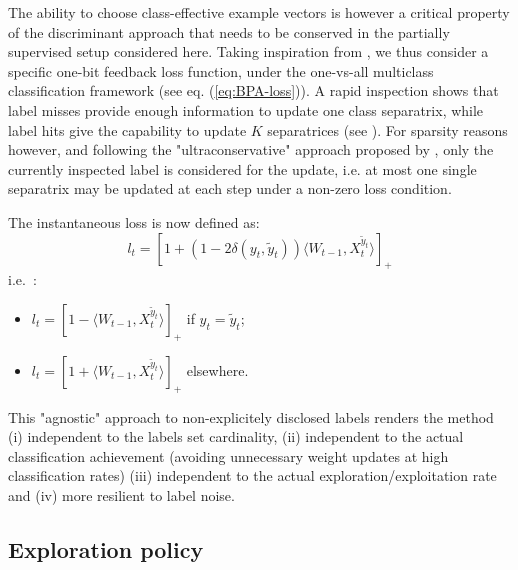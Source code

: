 \documentclass[preprint,12pt,authoryear]{elsarticle}
\begin{document}
The ability to choose class-effective example vectors is however  a critical property of the discriminant approach that needs to be conserved in the partially supervised setup considered here. 
Taking inspiration from \cite{crammer2006online}, we thus consider a specific one-bit feedback loss function, under the one-vs-all multiclass classification framework (see eq. (\ref{eq:BPA-loss})). A rapid inspection shows that label misses provide enough information to update one class separatrix, while label hits give the capability to update $K$ separatrices (see \cite{chen2009beyond}). For sparsity reasons however, and following the "ultraconservative" approach proposed by \cite{crammer2003ultraconservative}, only the currently inspected label is considered for the update, i.e. at most one single separatrix may be updated at each step under a non-zero loss condition.

The instantaneous loss is now defined as:
\begin{equation}\label{eq:loss}
l_t = [1 + (1 - 2 \delta(y_t,\tilde{y}_t)) \langle W_{t-1}, X_t^{\tilde{y}_t}\rangle]_+
\end{equation}
i.e.~:
\begin{itemize}
	\item[] $l_t = [1 - \langle W_{t-1}, X_t^{\tilde{y}_t}\rangle]_+$ if $y_t=\tilde{y}_t$;
	\item[] $l_t = [1 + \langle W_{t-1}, X_t^{\tilde{y}_t}\rangle]_+$ elsewhere.
\end{itemize}
This "agnostic" approach to non-explicitely disclosed labels %
renders the method (i) independent to the labels set cardinality, (ii) independent to the actual classification achievement (avoiding unnecessary weight updates at high classification rates) (iii) independent to the actual exploration/exploitation rate and (iv) more resilient to label noise. 

\subsection{Exploration policy}
\end{document}
